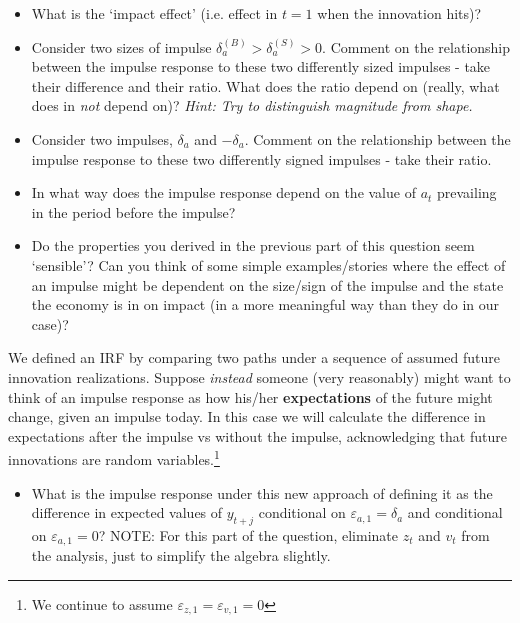\documentclass[authoryear,11pt]{elsarticle}
\begin{document}
\begin{itemize}
\item	What is the `impact effect' (i.e. effect in $t=1$ when the innovation hits)?
\item	Consider two sizes of impulse $\delta_{a}^{(B)} > \delta_{a}^{(S)} > 0$. Comment on the relationship between the impulse response to these two differently sized impulses - take their difference and their ratio. What does the ratio depend on (really, what does in \emph{not} depend on)? \emph{Hint: Try to distinguish magnitude from shape.}
\item	Consider two impulses, $\delta_{a}$ and $-\delta_{a}$. Comment on the relationship between the impulse response to these two differently signed impulses - take their ratio.
\item	In what way does the impulse response depend on the value of $a_{t}$ prevailing in the period before the impulse?
\item	Do the properties you derived in the previous part of this question seem `sensible'? Can you think of some simple examples/stories where the effect of an impulse might be dependent on the size/sign of the impulse and the state the economy is in on impact (in a more meaningful way than they do in our case)?
\end{itemize}

We defined an IRF by comparing two paths under a sequence of assumed future innovation realizations. Suppose \emph{instead} someone (very reasonably) might want to think of an impulse response as how his/her \textbf{expectations} of the future might change, given an impulse today. In this case we will calculate the difference in expectations after the impulse vs without the impulse, acknowledging that future innovations are random variables.\footnote{We continue to assume $\varepsilon_{z,1}=\varepsilon_{v,1}=0$}
\begin{itemize}
\item	What is the impulse response under this new approach of defining it as the difference in expected values of $y_{t+j}$ conditional on $\varepsilon_{a,1}=\delta_{a}$ and conditional on $\varepsilon_{a,1}=0$? NOTE: For this part of the question, eliminate $z_{t}$ and $v_{t}$ from the analysis, just to simplify the algebra slightly.
\end{itemize}
\end{document}
